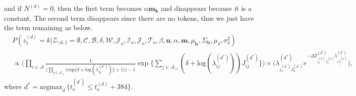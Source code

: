 \documentclass[a4paper]{article}
\begin{document}
   and if $N^{(d)} = 0$, then the first term becomes $\alpha\boldsymbol{m_k}$ and disappears because it is a constant. The second term disappears since there are no tokens, thus we just have the term remaining as below.
   \begin{equation}
   \begin{aligned}
   &P(z^{(d)}_1=k|\mathcal{Z}_{\backslash d, 1}=\emptyset,   \mathcal{C},   \mathcal{B}, \delta, \mathcal{W}, \mathcal{J}_{\mbox{a}}, \mathcal{I}_{\mbox{o}}, \mathcal{J}_{\mbox{o}}, \mathcal{T}_{\mbox{o}}, \beta, \boldsymbol{u}, \alpha, \boldsymbol{m},  \mu_{\boldsymbol{b}}, \Sigma_{\boldsymbol{b}}, \mu_\delta, \sigma^2_\delta)\\&\propto
   \Big( \prod_{i\in \mathcal{A}}\frac{1}{\Big(\prod_{j \in \mathcal{A}_{\backslash i}} \Big(\mbox{exp}\{\delta+\mbox{log}(\lambda_{ij}^{(d^*)})\} + 1\Big)\Big)-1}\exp\Big\{\sum_{j \in \mathcal{A}_{\backslash i}} (\delta+\mbox{log}(\lambda_{ij}^{(d^*)}))J_{ij}^{(d^*)} \Big\}\Big)\times \Big(\lambda^{(d^*)}_{i_o^{(d^*)}J_{o}^{(d^*)}}e^{-\Delta T^{(d^*)}_{i_o^{(d^*)}J_o^{(d^*)}}\lambda^{(d^*)}_{iJ^{(d^*)}_{i}}}\Big),
   \end{aligned}
   \end{equation}
   where $d^*=\mbox{argmax}_{d^\prime} \{t_o^{(d^\prime)} \leq t_o^{(d)}+384\}$.
\end{document}

